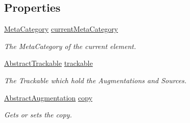 \subsection*{Properties}
\begin{DoxyCompactItemize}
\item 
\hypertarget{class_preview_controller_adf3c4a7bbd75ba87a843a3b56b0a04e2}{\hyperlink{namespace_a_rdev_kit_1_1_controller_1_1_editor_controller_a304367964b3f3f5c115bb81e7b31d534}{Meta\-Category} \hyperlink{class_preview_controller_adf3c4a7bbd75ba87a843a3b56b0a04e2}{current\-Meta\-Category}}\label{class_preview_controller_adf3c4a7bbd75ba87a843a3b56b0a04e2}

\begin{DoxyCompactList}\small\item\em The Meta\-Category of the current element. \end{DoxyCompactList}\item 
\hypertarget{class_preview_controller_a38df415628d33de07a741fd3d80f5647}{\hyperlink{class_a_rdev_kit_1_1_model_1_1_project_1_1_abstract_trackable}{Abstract\-Trackable} \hyperlink{class_preview_controller_a38df415628d33de07a741fd3d80f5647}{trackable}}\label{class_preview_controller_a38df415628d33de07a741fd3d80f5647}

\begin{DoxyCompactList}\small\item\em The Trackable which hold the Augmentations and Sources. \end{DoxyCompactList}\item 
\hyperlink{class_a_rdev_kit_1_1_model_1_1_project_1_1_abstract_augmentation}{Abstract\-Augmentation} \hyperlink{class_preview_controller_a3f44a88dd89aa311b734034de2f70417}{copy}
\begin{DoxyCompactList}\small\item\em Gets or sets the copy. \end{DoxyCompactList}\end{DoxyCompactItemize}


